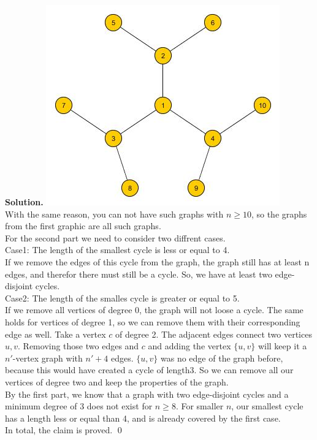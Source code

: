 \documentclass[a4paper,11pt]{amsart}
\newenvironment{solution}{\textbf{Solution.}}{\qed}
\begin{document}
\begin{solution}
	\includegraphics{A17_2} \\
	With the same reason, you can not have such graphs with $n\geq 10$, so the graphs from the first graphic are all such graphs. \\
	For the second part we need to consider two diffrent cases. \\
	Case1: The length of the smallest cycle is less or equal to 4. \\
	If we remove the edges of this cycle from the graph, the graph still has at least n edges, and therefor there must still be a cycle. So, we have at least two edge-disjoint cycles. \\
	Case2: The length of the smalles cycle is greater or equal to 5. \\
	If we remove all vertices of degree 0, the graph will not loose a cycle. The same holds for vertices of degree 1, so we can remove them with their corresponding edge as well. Take a vertex $c$ of degree 2. The adjacent edges connect two vertices $u,v$. Removing those two edges and $c$ and adding the vertex $\{u,v\}$ will keep it a $n'$-vertex graph with $n'+4$ edges. $\{u,v\}$ was no edge of the graph before, because this would have created a cycle of length3. So we can remove all our vertices of degree two and keep the properties of the graph. \\
	By the first part, we know that a graph with two edge-disjoint cycles and a minimum degree of 3 does not exist for $n \geq 8$. For smaller $n$, our smallest cycle has a length less or equal than 4, and is already covered by the first case. \\
	In total, the claim is proved.	 
\end{solution}
\end{document}
